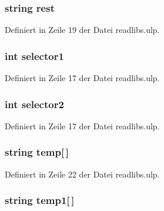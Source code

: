 \subsubsection[{rest}]{\setlength{\rightskip}{0pt plus 5cm}string rest}\label{readlibs_8ulp_afdccf00f7f9b4c4daf90921260c72e92}


Definiert in Zeile 19 der Datei readlibs.\+ulp.

\hypertarget{readlibs_8ulp_a2f0524c519c9a079ebbe76797552cfff}{}
\subsubsection[{selector1}]{\setlength{\rightskip}{0pt plus 5cm}int selector1}\label{readlibs_8ulp_a2f0524c519c9a079ebbe76797552cfff}


Definiert in Zeile 17 der Datei readlibs.\+ulp.

\hypertarget{readlibs_8ulp_acb22ea06df7a98062b750ecca56f1628}{}
\subsubsection[{selector2}]{\setlength{\rightskip}{0pt plus 5cm}int selector2}\label{readlibs_8ulp_acb22ea06df7a98062b750ecca56f1628}


Definiert in Zeile 17 der Datei readlibs.\+ulp.

\hypertarget{readlibs_8ulp_a2f8d954bdd72eba003a9802a6248de83}{}
\subsubsection[{temp}]{\setlength{\rightskip}{0pt plus 5cm}string temp\mbox{[}$\,$\mbox{]}}\label{readlibs_8ulp_a2f8d954bdd72eba003a9802a6248de83}


Definiert in Zeile 22 der Datei readlibs.\+ulp.

\hypertarget{readlibs_8ulp_a1739e013da948312edaaa3ade1bd7f7a}{}
\subsubsection[{temp1}]{\setlength{\rightskip}{0pt plus 5cm}string temp1\mbox{[}$\,$\mbox{]}}\label{readlibs_8ulp_a1739e013da948312edaaa3ade1bd7f7a}


